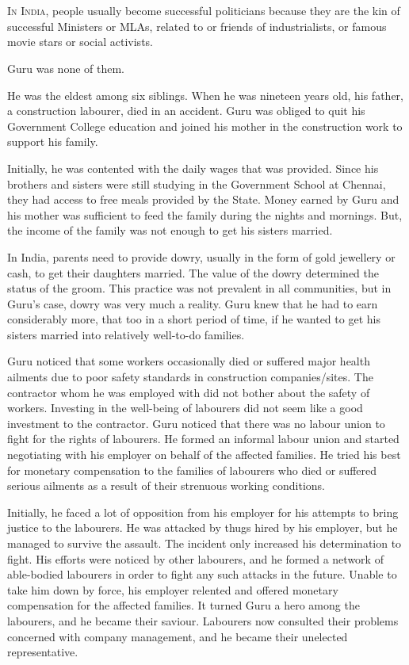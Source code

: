 \chapter{}

\lettrine{I}{n India}, people usually become successful politicians because they are the kin
of successful Ministers or MLAs, related to or friends of industrialists, or famous
movie stars or social activists.

Guru was none of them.

He was the eldest among six siblings. When he was nineteen years old, his
father, a construction labourer, died in an accident. Guru was obliged to quit
his Government College education and joined his mother in the construction work
to support his family.

Initially, he was contented with the daily wages that was provided. Since his
brothers and sisters were still studying in the Government School at Chennai,
they had access to free meals provided by the State. Money earned by Guru and
his mother was sufficient to feed the family during the nights and mornings.
But, the income of the family was not enough to get his sisters married.

In India, parents need to provide dowry, usually in the form of gold jewellery
or cash, to get their
daughters married. The value of the dowry determined the status of the groom.
This practice was not prevalent in all communities, but in Guru's case, dowry
was very much a reality. Guru knew that he had to earn considerably more, that
too in a short period of time, if he wanted to get his sisters married into
relatively well-to-do families.

Guru noticed that some workers occasionally died or suffered major health
ailments due to poor safety standards in construction companies/sites. The
contractor whom he was employed with did not bother about the safety of workers.
Investing in the well-being of labourers did not seem like a good investment to
the contractor. Guru noticed that there was no labour union to fight for the
rights of labourers. He formed an informal labour union and started negotiating
with his employer on behalf of the affected families. He tried his best for
monetary compensation to the families of labourers who died or suffered serious
ailments as a result of their strenuous working conditions.

Initially, he faced a lot of opposition from his employer for his attempts to
bring justice to the labourers. He was attacked by thugs hired by his employer,
but he managed to survive the assault. The incident only increased his
determination to fight. His efforts were noticed by other labourers, and he formed
a network of able-bodied labourers in order to fight any such attacks in the
future. Unable to take him down by force, his employer relented and offered
monetary compensation for the affected families. It turned Guru a hero among the
labourers, and he became their saviour. Labourers now consulted their problems
concerned with company management, and he became their unelected representative.

